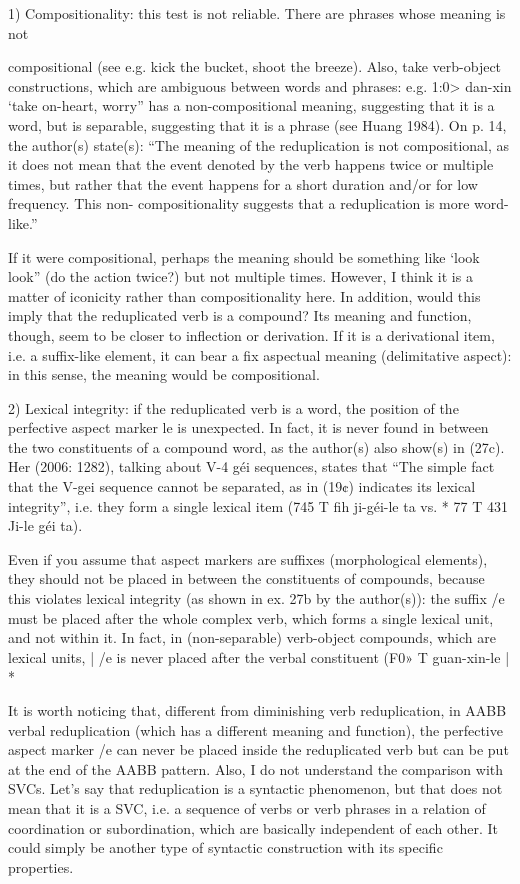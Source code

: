 \documentclass[fleqn,twoside]{article}
\begin{document}
\begin{enumerate}
1) Compositionality: this test is not reliable. There are phrases whose meaning is not

compositional (see e.g. kick the bucket, shoot the breeze). Also, take verb-object constructions,
which are ambiguous between words and phrases: e.g. 1:0> dan-xin ‘take on-heart, worry” has a
non-compositional meaning, suggesting that it is a word, but is separable, suggesting that it is a
phrase (see Huang 1984). On p. 14, the author(s) state(s): “The meaning of the reduplication is not
compositional, as it does not mean that the event denoted by the verb happens twice or multiple
times, but rather that the event happens for a short duration and/or for low frequency. This non-
compositionality suggests that a reduplication is more word-like.”

If it were compositional, perhaps the meaning should be something like ‘look look” (do the action twice?) but not multiple times. However, I think it is a matter of iconicity rather than compositionality here. In addition, would this imply that the reduplicated verb is a compound? Its meaning and function, though, seem to be closer to inflection or derivation. If it is a derivational item, i.e. a suffix-like element, it can bear a fix aspectual meaning (delimitative aspect): in this sense, the meaning would be compositional.

2) Lexical integrity: if the reduplicated verb is a word, the position of the perfective aspect
marker le is unexpected. In fact, it is never found in between the two constituents of a compound
word, as the author(s) also show(s) in (27c). Her (2006: 1282), talking about V-4 géi sequences,
states that “The simple fact that the V-gei sequence cannot be separated, as in (19¢) indicates its
lexical integrity”, i.e. they form a single lexical item (745 T fih ji-géi-le ta vs. * 77 T 431 Ji-le géi ta).


Even if you assume that aspect markers are suffixes (morphological elements), they should not be placed in between the constituents of compounds, because this violates lexical integrity (as shown in ex. 27b by the author(s)): the suffix /e must be placed after the whole complex verb, which forms a single lexical unit, and not within it. In fact, in (non-separable) verb-object compounds, which are lexical units, | /e is never placed after the verbal constituent (F0» T guan-xin-le | *%

It is worth noticing that, different from diminishing verb reduplication, in AABB verbal reduplication (which has a different meaning and function), the perfective aspect marker /e can never be placed inside the reduplicated verb but can be put at the end of the AABB pattern. Also, I do not understand the comparison with SVCs. Let’s say that reduplication is a syntactic phenomenon, but that does not mean that it is a SVC, i.e. a sequence of verbs or verb phrases in a relation of coordination or subordination, which are basically independent of each other. It could simply be another type of syntactic construction with its specific properties.


\end{enumerate}
\end{document}
